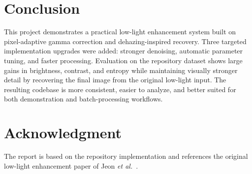 \documentclass[conference]{IEEEtran}
\begin{document}
\section{Conclusion}
This project demonstrates a practical low-light enhancement system built on pixel-adaptive gamma correction and dehazing-inspired recovery. Three targeted implementation upgrades were added: stronger denoising, automatic parameter tuning, and faster processing. Evaluation on the repository dataset shows large gains in brightness, contrast, and entropy while maintaining visually stronger detail by recovering the final image from the original low-light input. The resulting codebase is more consistent, easier to analyze, and better suited for both demonstration and batch-processing workflows.

\section*{Acknowledgment}
The report is based on the repository implementation and references the original low-light enhancement paper of Jeon \textit{et al.}~\cite{jeon2023}.



\end{document}
